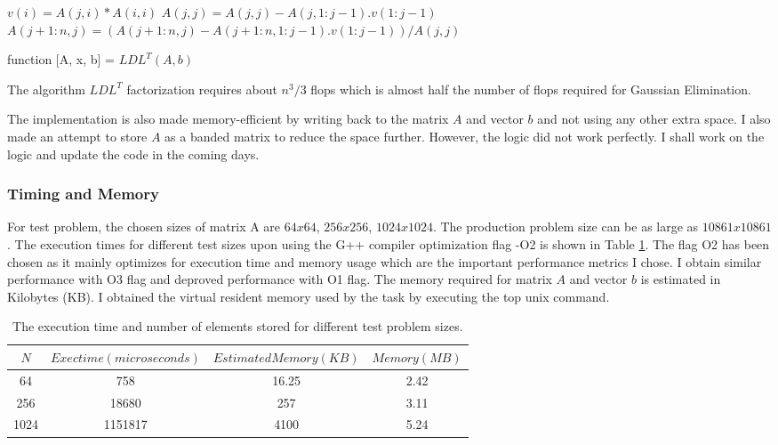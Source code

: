 \documentclass{article}
\begin{document}
\begin{spacing}{1.1}
\begin{algorithm}[H]
\begin{algorithmic}[1]
\STATE $v(i) = A(j,i)*A(i,i)$ 
\ENDFOR
\STATE $A(j,j) = A(j,j) - A(j,1:j-1).v(1:j-1)$
\STATE $A(j+1:n,j) = (A(j+1:n, j) - A(j+1:n,1:j-1).v(1:j-1))/A(j,j) $ 
\ENDFOR
\end{algorithmic}
\caption{\label{algoLDL} function [A, x, b] = $LDL^T(A, b)$} 
\end{algorithm}

The algorithm $LDL^T$ factorization requires about $n^3/3$ flops which is almost half the number of flops required for Gaussian Elimination. 

The implementation is also made memory-efficient by writing back to the matrix $A$ and vector $b$ and not using any other extra space. I also made an attempt to store $A$ as a banded matrix to reduce the space further. However, the logic did not work perfectly. I shall work on the logic and update the code in the coming days.

\subsubsection*{Timing and Memory}
For test problem, the chosen sizes of matrix A are $64x64$, $256x256$, $1024x1024$. The production problem size can be as large as $10861x10861$. 
The execution times for different test sizes upon using the G++ compiler optimization flag -O2 is shown in Table \ref{exec_direct}. The flag O2 has been chosen as it mainly optimizes for execution time and memory usage which are the important performance metrics I chose. I obtain similar performance with O3 flag and deproved performance with O1 flag. 
The memory required for matrix $A$ and vector $b$ is estimated in Kilobytes (KB). I obtained the virtual resident memory used by the task by executing the top unix command. 

\begin{table}[H]
\begin{center}
 \begin{tabular}{| c | c | c | c |} 
 \hline
$N$ & $Exec time (microseconds)$  & $Estimated Memory (KB)$ & $Memory (MB)$  \\ %
 \hline
64 & 758 & 16.25 & 2.42  \\ %
256 &  18680 &257 & 3.11 \\ %
1024 &  1151817 & 4100 & 5.24 \\ %
 \hline
\end{tabular}%
\end{center}
\caption{\label{exec_direct} The execution time and number of elements stored for different test problem sizes.  } 
\end{table}


\end{spacing}
\end{document}

